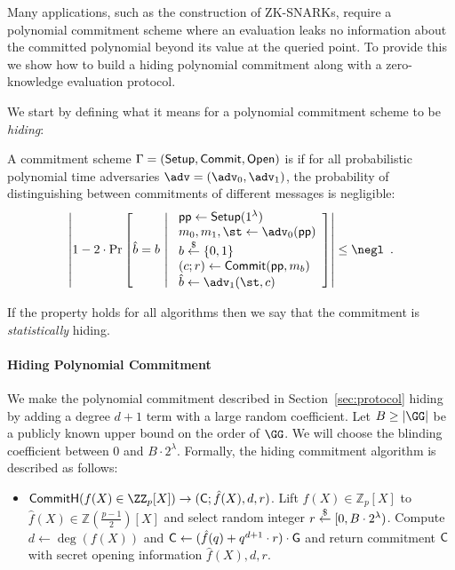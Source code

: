 Many applications, such as the construction of ZK-SNARKs, require a polynomial commitment scheme where an evaluation leaks no information about the committed polynomial beyond its value at the queried point. To provide this we show how to build a hiding polynomial commitment along with a zero-knowledge evaluation protocol.

We start by defining what it means for a polynomial commitment scheme to be \emph{hiding}:

\begin{definition}
A commitment scheme $\Gamma = (\textsf{{Setup}}, \textsf{{Commit}}, \textsf{{Open}})$ is  if for all probabilistic polynomial time adversaries $\adv = (\adv_0, \adv_1)$, the probability of distinguishing between commitments of different messages is negligible:
\[
	\left| 1 - 2 \cdot \mathrm{Pr}\left[
		\hat{b} = b \ \middle| \ 
		\begin{array}{l}
			\params \gets \pro{Setup}(1^\lambda) \\
			m_0, m_1, \st \gets \adv_0(\params) \\
			b \sample \{0,1\} \\
			(c; r) \gets \pro{Commit}(\params, m_b) \\
			\hat{b} \gets \adv_1(\st, c)
		\end{array}
	\right] \right| \leq \negl \enspace .
\]
\end{definition}
If the property holds for all algorithms then we say that the commitment is \emph{statistically} hiding.
\paragraph{Hiding Polynomial Commitment}
We make the polynomial commitment described in Section~\ref{sec:protocol} hiding by adding a degree $d+1$ term with a large random coefficient. Let $B\geq |\GG|$ be a publicly known upper bound on the order of $\GG$. We will choose the blinding coefficient between $0$ and $B\cdot 2^\lambda$. Formally, the hiding commitment algorithm is described as follows:
\begin{itemize}
	\item $\pro{CommitH}(f(X) \in \ZZ_p[X]) \rightarrow (\gr{C}; \hat{f}(X), d, r)$. Lift $f(X) \in \mathbb{Z}_p[X]$ to $\hat{f}(X) \in \mathbb{Z}(\frac{p-1}{2})[X]$ and select random integer $r \overset{\$}{\gets} [0,B\cdot 2^\lambda)$. Compute $d \gets \deg(f(X))$ and $\gr{C} \gets (\hat{f}(q)+q^{d+1} \cdot r)\cdot \gr{g}$ and return commitment $\gr{C}$ with secret opening information $\hat{f}(X), d, r$.
\end{itemize}

